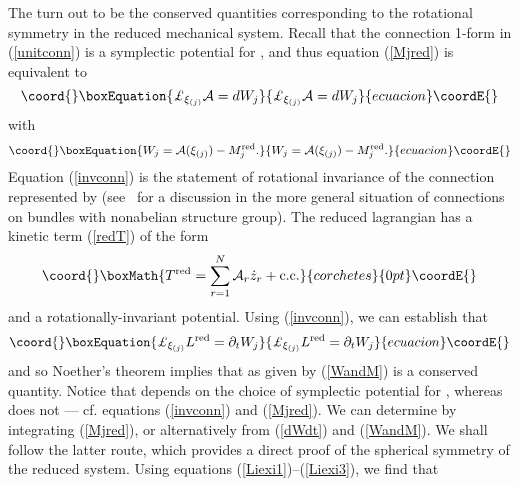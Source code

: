 \documentclass[a4paper,11pt]{article}
\begin{document}
The \coordHE{} turn out to be the conserved quantities
corresponding to the rotational symmetry in the reduced mechanical
system. Recall that the connection 1-form \coordHE{}
in (\ref{unitconn}) is a symplectic potential for \myHighlight{$\omega$}\coordHE{}, and thus
equation (\ref{Mjred}) is equivalent to 
\begin{equation}\coord{}\boxEquation{\label{invconn}
{\rm \pounds}_{\xi_{(j)}}{\cal A}=dW_{j}
}{{\rm \pounds}_{\xi_{(j)}}{\cal A}=dW_{j}
}{ecuacion}\coordE{}\end{equation}
with
\begin{equation}\coord{}\boxEquation{ \label{WandM}
W_{j}={\cal A}(\xi_{(j)})-M^{\rm red}_{j}.
}{ W_{j}={\cal A}(\xi_{(j)})-M^{\rm red}_{j}.
}{ecuacion}\coordE{}\end{equation}
Equation (\ref{invconn}) is the statement of rotational invariance of
the \coordHE{} connection represented by \coordHE{}
(see~\cite{JM} for a discussion
in the more general situation of connections on bundles with
nonabelian structure group). The reduced lagrangian \coordHE{} 
has a kinetic term (\ref{redT}) of the form
\[\coord{}\boxMath{
T^{\rm red}=\sum_{r=1}^{N}{\cal A}_{r}\dot{z}_{r}+ {\rm c.c.}
}{corchetes}{0pt}\coordE{}\]
and a rotationally-invariant potential. Using (\ref{invconn}), we can
establish that
\begin{equation}\coord{}\boxEquation{\label{dWdt}
{\rm \pounds}_{\xi_{(j)}}L^{\rm red}=\partial_{t}W_{j}
}{{\rm \pounds}_{\xi_{(j)}}L^{\rm red}=\partial_{t}W_{j}
}{ecuacion}\coordE{}\end{equation}
and so Noether's theorem implies that \coordHE{} as given by 
(\ref{WandM}) is a conserved quantity. Notice that
\coordHE{} depends on the choice of symplectic potential for \myHighlight{$\omega$}\coordHE{}, 
whereas \coordHE{} does not --- cf. equations (\ref{invconn}) 
and (\ref{Mjred}).
We can determine \coordHE{} 
by integrating (\ref{Mjred}), or alternatively from (\ref{dWdt}) 
and (\ref{WandM}). 
We shall follow the latter route, which provides a direct proof
of the spherical symmetry of the reduced system. Using equations
(\ref{Liexi1})--(\ref{Liexi3}),
we find that 
\end{document}
